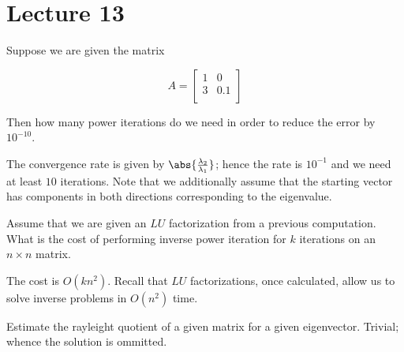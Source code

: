 \documentclass[../main.tex]{subfiles}
\begin{document}
\section{Lecture 13}

\begin{problem}
    Suppose we are given the matrix

    \[
        A = \begin{bmatrix}
            1 & 0 \\
            3 & 0.1 \\
        \end{bmatrix}
    \]

    Then how many power iterations do we need in order to reduce the error by $10^{-10}$.
\end{problem}
\begin{solution}
    The convergence rate is given by $\abs{\frac{\lambda_2}{\lambda_1}}$; hence the rate is $10^{-1}$ and we need at least $10$ iterations. Note that we additionally assume that the starting vector has components in both directions corresponding to the eigenvalue.
\end{solution}

\begin{problem}
    Assume that we are given an $LU$ factorization from a previous computation. What is the cost of performing inverse power iteration for $k$ iterations on an $n \times n$ matrix.
\end{problem}

\begin{solution}
    The cost is $O(kn^2)$. Recall that $LU$ factorizations, once calculated, allow us to solve inverse problems in $O(n^2)$ time.
\end{solution}

\begin{problem}
    Estimate the rayleight quotient of a given matrix for a given eigenvector. Trivial; whence the solution is ommitted.
\end{problem}
\end{document}
